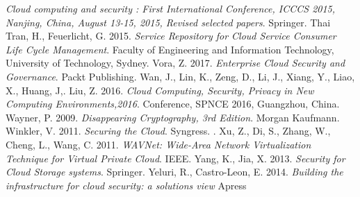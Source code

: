 \documentclass{article}
\begin{document}
\begin{thebibliography}{9}
	\textit{Cloud computing and security : First International Conference, ICCCS 2015, Nanjing, China, August 13-15, 2015, Revised selected papers}.
	Springer.
        Thai Tran, H.,
        Feuerlicht, G.
        2015.
        \textit{Service Repository for Cloud Service Consumer Life Cycle Management}.
	Faculty of Engineering and Information Technology,
        University of Technology, Sydney.
        Vora, Z.
        2017.
	\textit{Enterprise Cloud Security and Governance}.
	Packt Publishing.
        Wan, J.,
        Lin, K.,
        Zeng, D.,
        Li, J.,
        Xiang, Y.,
        Liao, X.,
        Huang, J,.
        Liu, Z.
        2016.
        \textit{Cloud Computing, Security, Privacy in New Computing Environments,2016}.
	Conference, SPNCE 2016, Guangzhou, China.
        Wayner, P.
        2009.
	\textit{Disappearing Cryptography, 3rd Edition}.
        Morgan Kaufmann.
        Winkler, V.
	2011.
	\textit{Securing the Cloud}.
        Syngress.
.
        Xu, Z.,
        Di, S.,
        Zhang, W.,
        Cheng, L.,
        Wang, C.
	2011.
        \textit{WAVNet: Wide-Area Network Virtualization Technique for Virtual Private Cloud}.
        IEEE.
        Yang, K.,
	Jia, X.
        2013.
	\textit{Security for Cloud Storage systems}.
        Springer.
        Yeluri, R.,
        Castro-Leon, E.
        2014.
	\textit{Building the infrastructure for cloud security: a solutions view}
        Apress

\end{thebibliography}
\end{document}

